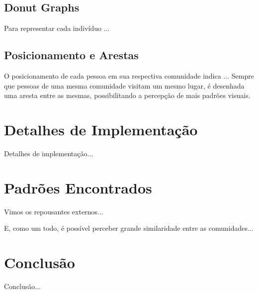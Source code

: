 \documentclass[12pt]{article}
\begin{document}
\subsection{Donut Graphs}
Para representar cada indivíduo ...

\subsection{Posicionamento e Arestas}
O posicionamento de cada pessoa em sua respectiva comunidade indica ...
Sempre que pessoas de uma mesma comunidade visitam um mesmo lugar, é desenhada
uma aresta entre as mesmas, possibilitando a percepção de mais padrões visuais.


\section{Detalhes de Implementação}
Detalhes de implementação...

\section{Padrões Encontrados}
Vimos os repousantes externos...

E, como um todo, é possível perceber grande similaridade entre
as comunidades...

\section{Conclusão}
Conclusão...

% 
% 
\end{document}
